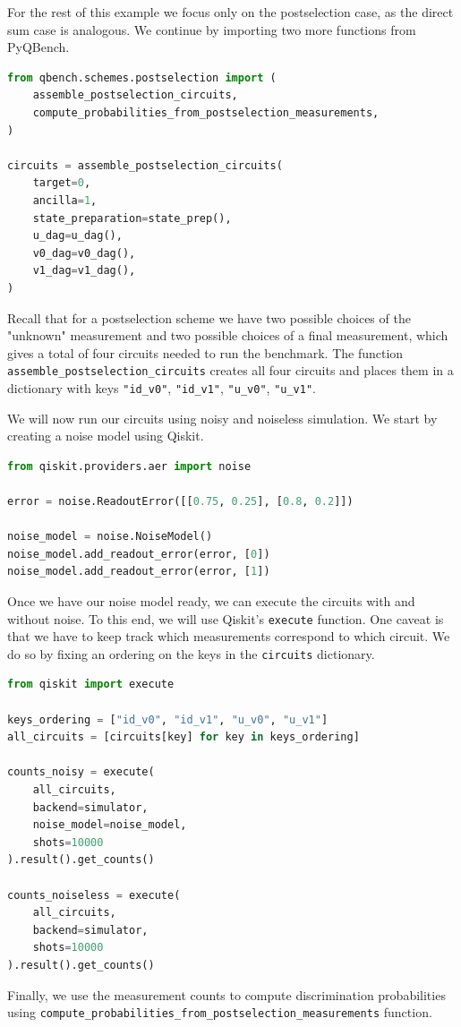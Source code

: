 \documentclass[preprint,12pt, a4paper, dvipsnames]{elsarticle}
\newcommand{\1}{{\rm 1\hspace{-0.9mm}l}}
\theoremstyle{definition}
\begin{document}
For the rest of this example we focus only on the postselection case, as the direct sum case is
analogous. We continue by importing two more functions from PyQBench.
\begin{lstlisting}[language=Python, caption= Assembling circuits]
from qbench.schemes.postselection import (
    assemble_postselection_circuits,
    compute_probabilities_from_postselection_measurements,
)

circuits = assemble_postselection_circuits(
	target=0,
	ancilla=1,
	state_preparation=state_prep(),
	u_dag=u_dag(),
	v0_dag=v0_dag(),
	v1_dag=v1_dag(),
)

\end{lstlisting}
Recall that for a postselection scheme we have two possible choices of the "unknown" measurement and
two possible choices of a final measurement, which gives a total of four circuits needed to run the
benchmark. The function \texttt{assemble\_postselection\_circuits} creates all four circuits and
places them in a dictionary with keys \texttt{"id\_v0"}, \texttt{"id\_v1"}, \texttt{"u\_v0"},
\texttt{"u\_v1"}.

We will now run our circuits using noisy and noiseless simulation. We start by creating a noise
model using Qiskit.


\begin{lstlisting}[language=Python, caption=Adding noise model]
from qiskit.providers.aer import noise

error = noise.ReadoutError([[0.75, 0.25], [0.8, 0.2]])

noise_model = noise.NoiseModel()
noise_model.add_readout_error(error, [0])
noise_model.add_readout_error(error, [1])
\end{lstlisting}
Once we have our noise model ready, we can execute the circuits with and without noise. To this end,
we will use Qiskit’s \texttt{execute} function. One caveat is that we have to keep track which
measurements correspond to which circuit. We do so by fixing an ordering on the keys in the \texttt{circuits} dictionary.
\begin{lstlisting}[language=Python, caption=Running  circuits]
from qiskit import execute

keys_ordering = ["id_v0", "id_v1", "u_v0", "u_v1"]
all_circuits = [circuits[key] for key in keys_ordering]

counts_noisy = execute(
	all_circuits,
	backend=simulator,
	noise_model=noise_model,
	shots=10000
).result().get_counts()

counts_noiseless = execute(
	all_circuits,
	backend=simulator,
	shots=10000
).result().get_counts()
\end{lstlisting}
Finally, we use the measurement counts to compute discrimination probabilities using \texttt{compute\_probabilities\_from\_postselection\_measurements} function.
\end{document}
